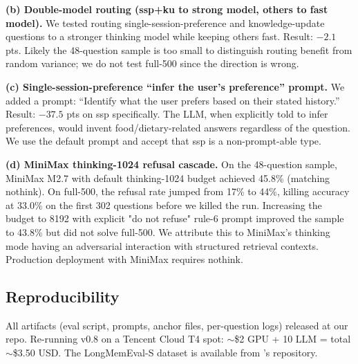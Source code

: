 \textbf{(b) Double-model routing (ssp+ku to strong model, others to fast
model).} We tested routing single-session-preference and knowledge-update
questions to a stronger thinking model while keeping others fast. Result:
\(-2.1\) pts. Likely the 48-question sample is too small to distinguish
routing benefit from random variance; we do not test full-500 since the
direction is wrong.

\textbf{(c) Single-session-preference ``infer the user's preference''
prompt.} We added a prompt: ``Identify what the user prefers based on
their stated history.'' Result: \(-37.5\) pts on ssp specifically. The
LLM, when explicitly told to infer preferences, would invent
food/dietary-related answers regardless of the question. We use the
default prompt and accept that ssp is a non-prompt-able type.

\textbf{(d) MiniMax thinking-1024 refusal cascade.} On the 48-question
sample, MiniMax M2.7 with default thinking-1024 budget achieved 45.8\%
(matching nothink). On full-500, the refusal rate jumped from 17\% to
44\%, killing accuracy at 33.0\% on the first 302 questions before we
killed the run. Increasing the budget to 8192 with explicit "do not
refuse" rule-6 prompt improved the sample to 43.8\% but did not solve
full-500. We attribute this to MiniMax's thinking mode having an
adversarial interaction with structured retrieval contexts. Production
deployment with MiniMax requires nothink.

\subsection{Reproducibility}

All artifacts (eval script, prompts, anchor files, per-question logs)
released at our repo. Re-running v0.8 on a Tencent Cloud T4 spot:
\(\sim\)\$2 GPU + \cny{}10 LLM = total \(\sim\)\$3.50 USD. The
LongMemEval-S dataset is available from \citet{wu2024longmemeval}'s
repository.
